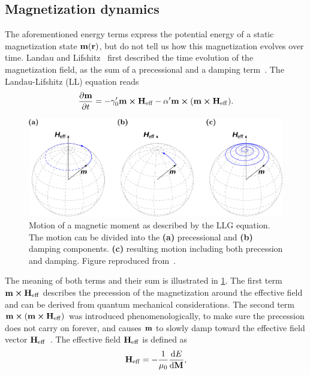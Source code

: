 \documentclass[11pt,a4paper,english,twoside]{article}
\begin{document}
\subsection{Magnetization dynamics}
The aforementioned energy terms express the potential energy of a static magnetization state $\vb{m}(\vb{r})$, but do not tell us how this magnetization evolves over time. Landau and Lifshitz~\cite{lifdau} first described the time evolution of the magnetization field, as the sum of a precessional and a damping term~\cite{NML_Carlton, abert2013discrete, phd_leliaert}. The Landau-Lifshitz (LL) equation reads
\begin{equation}
    \frac{\partial \vb{m}}{\partial t} = - \gamma_0' \vb{m} \cross \vb{H_\mathrm{eff}} - \alpha' \vb{m} \cross (\vb{m} \cross \vb{H_\mathrm{eff}}) \mathrm{.}
    \label{eq:LL}
\end{equation}
\begin{figure}
    \centering
    \includegraphics[width=0.8\columnwidth]{Figures/Introduction/abert2013discrete - Figure 2.2.pdf}
    \caption{Motion of a magnetic moment as described by the LLG equation. The motion can be divided into the \textbf{(a)} precessional and \textbf{(b)} damping components. \textbf{(c)} resulting motion including both precession and damping. Figure reproduced from~\cite{abert2013discrete}.}
    \label{fig:LLG_motion_Heff}
\end{figure}
\par The meaning of both terms and their sum is illustrated in \cref{fig:LLG_motion_Heff}. The first term $\vb{m} \cross \vb{H_\mathrm{eff}}$ describes the precession of the magnetization around the effective field and can be derived from quantum mechanical considerations. The second term $\vb{m} \cross (\vb{m} \cross \vb{H_\mathrm{eff}})$ was introduced phenomenologically, to make sure the precession does not carry on forever, and causes $\vb{m}$ to slowly damp toward the effective field vector $\vb{H_\mathrm{eff}}$~\cite{NML_Carlton}. The effective field $\vb{H_\mathrm{eff}}$ is defined as
\begin{equation}
	\vb{H_\mathrm{eff}} = - \frac{1}{\mu_0} \frac{\mathrm{d} E}{\mathrm{d} \vb{M}} \mathrm{,}
	\label{eq:H_eff}
\end{equation}
\end{document}
